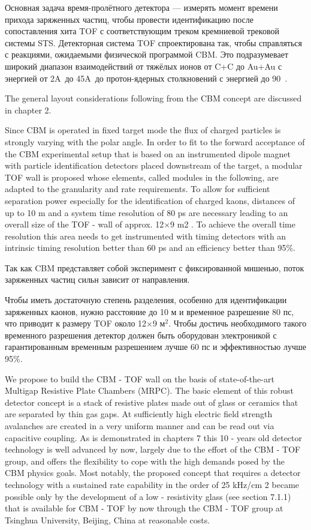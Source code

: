 Основная задача время-пролётного детектора --- измерять момент времени прихода заряженных частиц, чтобы провести идентификацию после сопоставления хита TOF с соответствующим треком кремниевой трековой системы STS. Детекторная система TOF спроектирована так, чтобы справляться с реакциями, ожидаемыми физической программой CBM. Это подразумевает широкий диапазон взаимодействий от тяжёлых ионов от C+C до Au+Au с энергией от 2A~\GeV до 45A~\GeV до протон-ядерных столкновений с энергией до 90~\GeV.

The general layout considerations following from the CBM concept are discussed in chapter 2.

Since CBM is operated in fixed target mode the flux of charged particles is strongly varying with the polar angle. In order to fit to the forward acceptance of the CBM experimental setup that is based on an instrumented dipole magnet with particle identification detectors placed downstream of the target, a modular TOF wall is proposed whose elements, called modules in the following, are adapted to the granularity and rate requirements. To allow for sufficient separation power especially for the identification of charged kaons, distances of up to 10 m and a system time resolution of 80 ps are necessary leading to an overall size of the TOF - wall of approx. 12$\times$9 m2 . To achieve the overall time resolution this area needs to get instrumented with timing detectors with an intrinsic timing resolution better than 60 ps and an efficiency better than 95\%.

Так как CBM представляет собой эксперимент с фиксированной мишенью, поток заряженных частиц сильн зависит от направления.

Чтобы иметь достаточную степень разделения, особенно для идентификации заряженных каонов, нужно расстояние до 10 м и временное разрешение 80 пс, что приводит к размеру TOF около 12$\times$9 м$^2$. Чтобы достичь необходимого такого временного разрешения детектор должен быть оборудован электроникой с гарантированным временным разрешением лучше 60 пс и эффективностью лучше 95\%.

We propose to build the CBM - TOF wall on the basis of state-of-the-art Multigap Resistive Plate Chambers (MRPC). The basic element of this robust detector concept is a stack of resistive plates made out of glass or ceramics that are separated by thin gas gaps. At sufficiently high electric field strength avalanches are created in a very uniform manner and can be read out via capacitive coupling. As is demonstrated in chapters 7 this 10 - years old detector technology is well advanced by now, largely due to the effort of the CBM - TOF group, and offers the flexibility to cope with the high demands posed by the CBM physics goals. Most notably, the proposed concept that requires a detector technology with a sustained rate capability in the order of 25 kHz/cm 2 became possible only by the development of a low - resistivity glass (see section 7.1.1) that is available for CBM - TOF by now through the CBM - TOF group at Tsinghua University, Beijing, China at reasonable costs.

